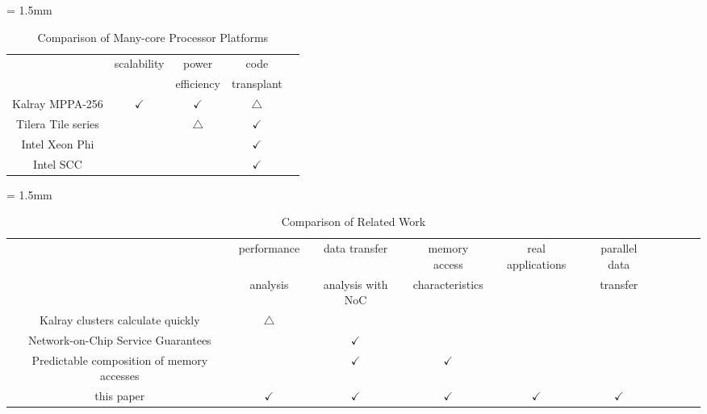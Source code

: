 \documentclass[conference,compsoc]{IEEEtran}
\begin{document}
\begin{table}[t]
  \caption{\label{tb:comparison_manycore}
    Comparison of Many-core Processor Platforms}
  \centering
  \scriptsize	                    %
  \tabcolsep = 1.5mm              %
  \begin{tabular}{c|cccc}
    \hline
    & \multirow{2}{*}{scalability} & power  & code & \\
    & & efficiency & transplant & \\
    \hline
    \hline
    Kalray MPPA-256 \cite{de2014time} & \(\checkmark\) & \(\checkmark\) & \(\bigtriangleup\) & \\
    Tilera Tile series \cite{bell2008tile64} &  & \(\bigtriangleup\) & \(\checkmark\) & \\
    Intel Xeon Phi \cite{chrysos2014intel} \cite{chrysos2012intel} &  &  & \(\checkmark\) & \\
    Intel SCC \cite{baron2010single} &  &  & \(\checkmark\) & \\
    \hline
  \end{tabular}
  \vspace{-5mm}
\end{table}

\begin{table}[t]
  \caption{\label{tb:comparison_relatedwork}
    Comparison of Related Work}
  \centering
  \scriptsize	                    %
  \tabcolsep = 1.5mm              %
  \begin{tabular}{c|ccccccccc}
    \hline
    & performance & data transfer & memory access & \multirow{2}{*}{real applications} & parallel data & \\
    & analysis & analysis with NoC & characteristics & & transfer & \\
    \hline
    \hline
    Kalray clusters calculate quickly \cite{kanter2015kalray} & \(\bigtriangleup\) &  &  &  &  & \\
    Network-on-Chip Service Guarantees \cite{denet2017work} &  & \(\checkmark\) &  &  &  & \\
    Predictable composition of memory accesses \cite{perret2016predictable} &  & \(\checkmark\) & \(\checkmark\) &  &  & \\
    this paper & \(\checkmark\) & \(\checkmark\) & \(\checkmark\) & \(\checkmark\) & \(\checkmark\) & \\
    \hline
  \end{tabular}
  \vspace{-5mm}
\end{table}
\end{document}
